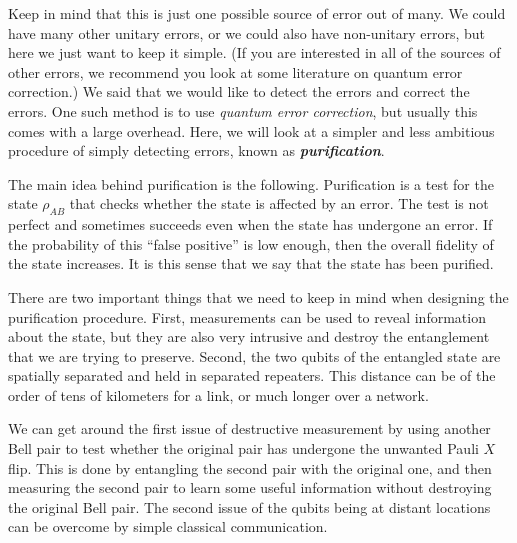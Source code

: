Keep in mind that this is just one possible source of error out of many.
We could have many other unitary errors, or we could also have non-unitary errors, but here we just want to keep it simple.
(If you are interested in all of the sources of other errors, we recommend you look at some literature on quantum error correction.)
We said that we would like to detect the errors and correct the errors. One such method is to use \emph{quantum error correction}, but usually this comes with a large overhead.
Here, we will look at a simpler and less ambitious procedure of simply detecting errors, known as \textit{\textbf{purification}}.

The main idea behind purification is the following.
Purification is a test for the state $\rho_{AB}$ that checks whether the state is affected by an error.
The test is not perfect and sometimes succeeds even when the state has undergone an error.
If the probability of this ``false positive'' is low enough, then the overall fidelity of the state increases.
It is this sense that we say that the state has been purified.

There are two important things that we need to keep in mind when designing the purification procedure.
First, measurements can be used to reveal information about the state,
but they are also very intrusive and destroy the entanglement that we are trying to preserve.
Second, the two qubits of the entangled state are spatially separated and held in separated repeaters.
This distance can be of the order of tens of kilometers for a link, or much longer over a network.

We can get around the first issue of destructive measurement by using another Bell pair to test whether the original pair has undergone the unwanted Pauli $X$ flip.
This is done by entangling the second pair with the original one, and then measuring the second pair to learn some useful information without destroying the original Bell pair.
The second issue of the qubits being at distant locations can be overcome by simple classical communication.

